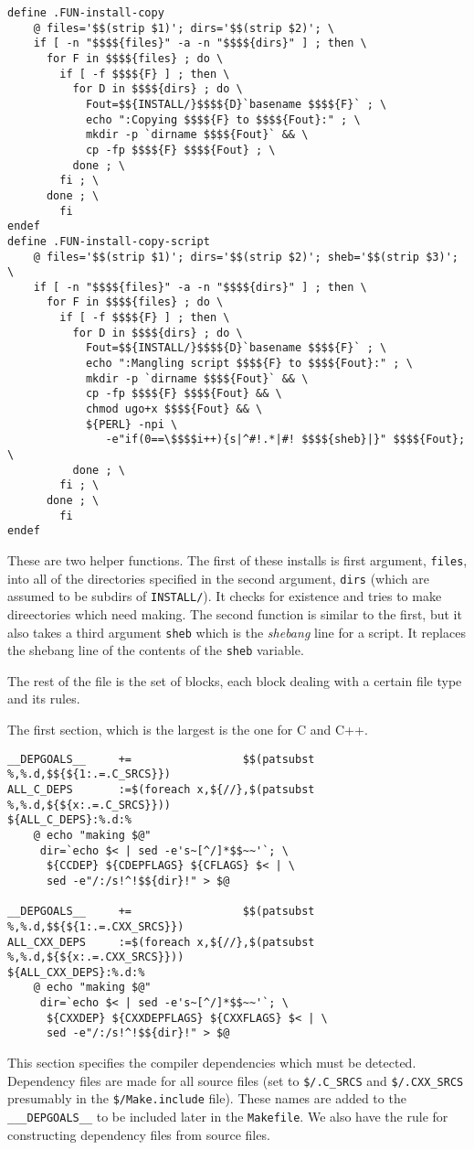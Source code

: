 \documentclass{article}
\begin{document}
\begin{verbatim}
define .FUN-install-copy
	@ files='$$(strip $1)'; dirs='$$(strip $2)'; \
	if [ -n "$$$${files}" -a -n "$$$${dirs}" ] ; then \
	  for F in $$$${files} ; do \
	    if [ -f $$$${F} ] ; then \
	      for D in $$$${dirs} ; do \
	        Fout=$${INSTALL/}$$$${D}`basename $$$${F}` ; \
	        echo ":Copying $$$${F} to $$$${Fout}:" ; \
	        mkdir -p `dirname $$$${Fout}` && \
	        cp -fp $$$${F} $$$${Fout} ; \
	      done ; \
	    fi ; \
	  done ; \
        fi
endef
define .FUN-install-copy-script
	@ files='$$(strip $1)'; dirs='$$(strip $2)'; sheb='$$(strip $3)'; \
	if [ -n "$$$${files}" -a -n "$$$${dirs}" ] ; then \
	  for F in $$$${files} ; do \
	    if [ -f $$$${F} ] ; then \
	      for D in $$$${dirs} ; do \
	        Fout=$${INSTALL/}$$$${D}`basename $$$${F}` ; \
	        echo ":Mangling script $$$${F} to $$$${Fout}:" ; \
	        mkdir -p `dirname $$$${Fout}` && \
	        cp -fp $$$${F} $$$${Fout} && \
	        chmod ugo+x $$$${Fout} && \
	        ${PERL} -npi \
	           -e"if(0==\$$$$i++){s|^#!.*|#! $$$${sheb}|}" $$$${Fout}; \
	      done ; \
	    fi ; \
	  done ; \
        fi
endef
\end{verbatim}
These are two helper functions.  The first of these installs is first
argument, \verb+files+, into all of the directories specified in the
second argument, \verb+dirs+ (which are assumed to be subdirs of
\verb+INSTALL/+).  It checks for existence and tries to make
direectories which need making.  The second function is similar to the
first, but it also takes a third argument \verb+sheb+ which is the
{\em shebang} line for a script.  It replaces the shebang line of the
contents of the \verb+sheb+ variable.

The rest of the file is the set of blocks, each block dealing with
a certain file type and its rules.

The first section, which is the largest is the one for C and C++.
\begin{verbatim}
__DEPGOALS__     +=                 $$(patsubst %,%.d,$${${1:.=.C_SRCS}})
ALL_C_DEPS       :=$(foreach x,${//},$(patsubst %,%.d,${${x:.=.C_SRCS}}))
${ALL_C_DEPS}:%.d:%
	@ echo "making $@"
	 dir=`echo $< | sed -e's~[^/]*$$~~'`; \
	  ${CCDEP} ${CDEPFLAGS} ${CFLAGS} $< | \
	  sed -e"/:/s!^!$${dir}!" > $@

__DEPGOALS__     +=                 $$(patsubst %,%.d,$${${1:.=.CXX_SRCS}})
ALL_CXX_DEPS     :=$(foreach x,${//},$(patsubst %,%.d,${${x:.=.CXX_SRCS}}))
${ALL_CXX_DEPS}:%.d:%
	@ echo "making $@"
	 dir=`echo $< | sed -e's~[^/]*$$~~'`; \
	  ${CXXDEP} ${CXXDEPFLAGS} ${CXXFLAGS} $< | \
	  sed -e"/:/s!^!$${dir}!" > $@
\end{verbatim}
This section specifies the compiler dependencies which must be
detected.  Dependency files are made for all source files
(set to \verb+$/.C_SRCS+ and \verb+$/.CXX_SRCS+ presumably in
the \verb+$/Make.include+ file).  These
names are added to the \verb+___DEPGOALS__+ to be included later
in the \verb+Makefile+.  We also have the rule for constructing
dependency files from source files.
\end{document}
